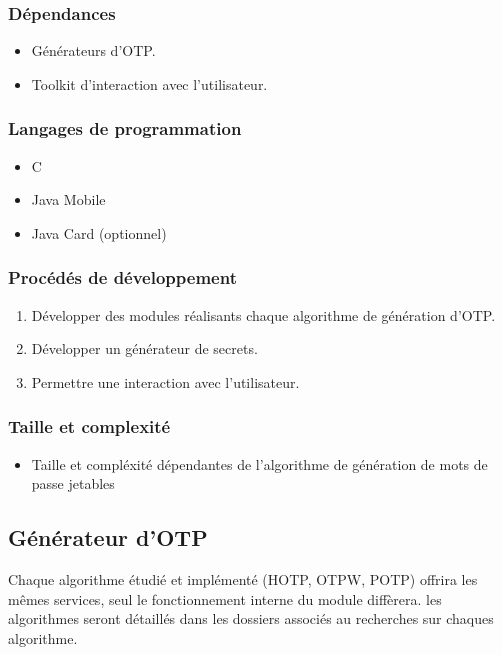 \documentclass{"../../res/univ-projet"}
\begin{document}
    \subsubsection{Dépendances}
        \begin{itemize}
            \item Générateurs d'OTP.
            \item Toolkit d'interaction avec l'utilisateur.
        \end{itemize}

    \subsubsection{Langages de programmation}
    \begin{itemize}
        \item C
        \item Java Mobile
        \item Java Card (optionnel)
    \end{itemize}

    \subsubsection{Procédés de développement}
    \begin{enumerate}
        \item Développer des modules réalisants chaque algorithme de génération
            d'OTP.
        \item Développer un générateur de secrets.
        \item Permettre une interaction avec l'utilisateur.
    \end{enumerate}

    \subsubsection{Taille et complexité}
    \begin{itemize}
        \item Taille et compléxité dépendantes de l'algorithme de génération
            de mots de passe jetables
    \end{itemize}

\subsection{Générateur d'OTP}
    Chaque algorithme \'etudi\'e et impl\'ement\'e (HOTP, OTPW, POTP) offrira les
    mêmes services, seul le fonctionnement interne du module diffèrera.
    les algorithmes seront détaillés dans les dossiers associés au recherches sur 
    chaques algorithme.
\end{document}
